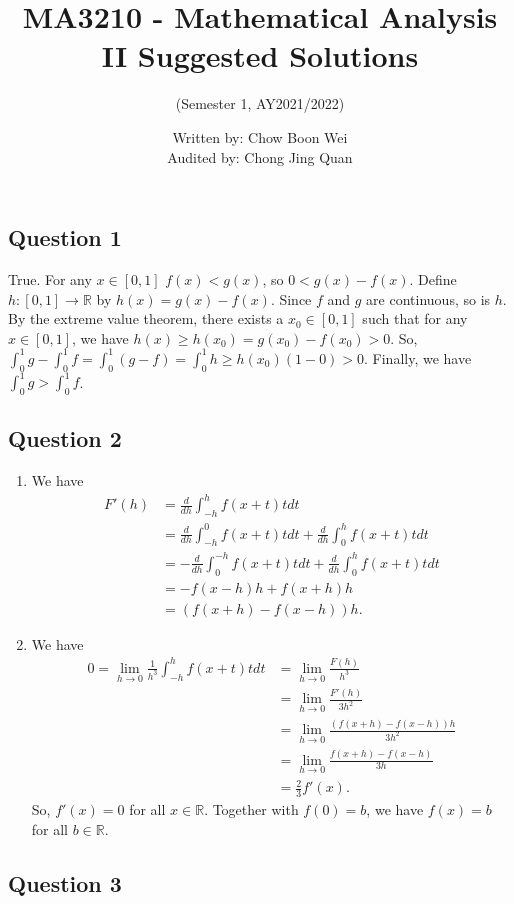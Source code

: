 \documentclass{article}
\title{MA3210 - Mathematical Analysis II Suggested Solutions}
\author{(Semester 1, AY2021/2022)}
\date{Written by: Chow Boon Wei\\Audited by: Chong Jing Quan}
\newcommand{\R}{\mathbb{R}}
\begin{document}
\maketitle
\subsection*{Question 1}
True. For any $x\in[0,1]$ $f(x)<g(x)$, so $0<g(x)-f(x)$. Define $h:[0,1]\to \R$ by $h(x)=g(x)-f(x)$. 
Since $f$ and $g$ are continuous, so is $h$. By the extreme value theorem, there exists a 
$x_0 \in [0,1]$ such that for any $x\in [0,1]$, we have $h(x)\geq h(x_0) = g(x_0)-f(x_0)>0$.
So, $\int_0^1 g - \int_0^1 f = \int_0^1 (g-f) = \int_0^1 h \geq h(x_0)(1-0) >0$. 
Finally, we have $\int_0^1 g > \int_0^1 f$.

\subsection*{Question 2}
\begin{enumerate}[label=\roman*)]
\item We have 
\begin{align*}
F'(h) &= \frac{d}{dh} \int_{-h}^h f(x+t)t dt \\
&= \frac{d}{dh} \int_{-h}^0 f(x+t)t dt + \frac{d}{dh} \int_{0}^h f(x+t)t dt \\
&= -\frac{d}{dh} \int_{0}^{-h} f(x+t)t dt + \frac{d}{dh} \int_{0}^h f(x+t)t dt \\
&= -f(x-h)h + f(x+h)h \\
&= ( f(x+h) - f(x-h) ) h. 
\end{align*}

\item We have 
\begin{align*}
    0=\lim_{h\to 0} \frac{1}{h^3} \int_{-h}^h f(x+t)t dt 
    &= \lim_{h\to 0} \frac{F(h)}{h^3} \\
    &= \lim_{h\to 0} \frac{F'(h)}{3h^2} \\
    &= \lim_{h\to 0} \frac{( f(x+h) - f(x-h) ) h }{3h^2} \\
    &= \lim_{h\to 0} \frac{ f(x+h) - f(x-h) }{3h}  \\
    &= \frac{2}{3}f'(x). 
\end{align*}
So, $f'(x) = 0$ for all $x\in \R$. Together with $f(0)=b$, we have $f(x)=b$ for all $b\in\R$.
\end{enumerate}
\subsection*{Question 3}
\end{document}
